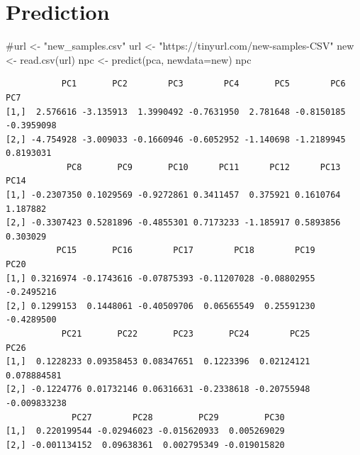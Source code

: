 \documentclass[
  letterpaper,
  DIV=11,
  numbers=noendperiod]{scrartcl}
\newenvironment{Shaded}{\begin{snugshade}}{\end{snugshade}}
\newcommand{\AttributeTok}[1]{\textcolor[rgb]{0.40,0.45,0.13}{#1}}
\newcommand{\CommentTok}[1]{\textcolor[rgb]{0.37,0.37,0.37}{#1}}
\newcommand{\DecValTok}[1]{\textcolor[rgb]{0.68,0.00,0.00}{#1}}
\newcommand{\FunctionTok}[1]{\textcolor[rgb]{0.28,0.35,0.67}{#1}}
\newcommand{\NormalTok}[1]{\textcolor[rgb]{0.00,0.23,0.31}{#1}}
\newcommand{\OtherTok}[1]{\textcolor[rgb]{0.00,0.23,0.31}{#1}}
\newcommand{\SpecialCharTok}[1]{\textcolor[rgb]{0.37,0.37,0.37}{#1}}
\newcommand{\StringTok}[1]{\textcolor[rgb]{0.13,0.47,0.30}{#1}}
\begin{document}
\hypertarget{prediction}{%
\section{Prediction}\label{prediction}}

\begin{Shaded}
\begin{Highlighting}[]
\CommentTok{\#url \textless{}{-} "new\_samples.csv"}
\NormalTok{url }\OtherTok{\textless{}{-}} \StringTok{"https://tinyurl.com/new{-}samples{-}CSV"}
\NormalTok{new }\OtherTok{\textless{}{-}} \FunctionTok{read.csv}\NormalTok{(url)}
\NormalTok{npc }\OtherTok{\textless{}{-}} \FunctionTok{predict}\NormalTok{(pca, }\AttributeTok{newdata=}\NormalTok{new)}
\NormalTok{npc}
\end{Highlighting}
\end{Shaded}

\begin{verbatim}
           PC1       PC2        PC3        PC4       PC5        PC6        PC7
[1,]  2.576616 -3.135913  1.3990492 -0.7631950  2.781648 -0.8150185 -0.3959098
[2,] -4.754928 -3.009033 -0.1660946 -0.6052952 -1.140698 -1.2189945  0.8193031
            PC8       PC9       PC10      PC11      PC12      PC13     PC14
[1,] -0.2307350 0.1029569 -0.9272861 0.3411457  0.375921 0.1610764 1.187882
[2,] -0.3307423 0.5281896 -0.4855301 0.7173233 -1.185917 0.5893856 0.303029
          PC15       PC16        PC17        PC18        PC19       PC20
[1,] 0.3216974 -0.1743616 -0.07875393 -0.11207028 -0.08802955 -0.2495216
[2,] 0.1299153  0.1448061 -0.40509706  0.06565549  0.25591230 -0.4289500
           PC21       PC22       PC23       PC24        PC25         PC26
[1,]  0.1228233 0.09358453 0.08347651  0.1223396  0.02124121  0.078884581
[2,] -0.1224776 0.01732146 0.06316631 -0.2338618 -0.20755948 -0.009833238
             PC27        PC28         PC29         PC30
[1,]  0.220199544 -0.02946023 -0.015620933  0.005269029
[2,] -0.001134152  0.09638361  0.002795349 -0.019015820
\end{verbatim}

\begin{Shaded}
\end{Shaded}
\end{document}
